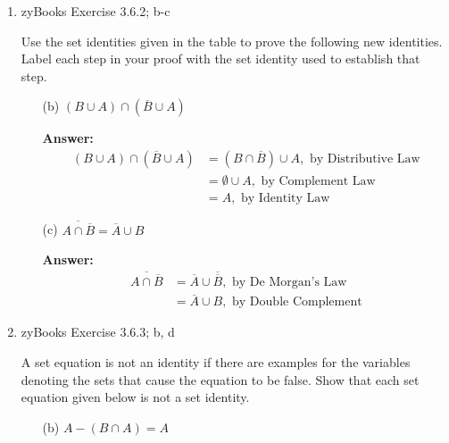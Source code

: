 \documentclass[14pt]{extreport}
\newcommand{\answer}[0]{\medskip \textbf{Answer:} \medskip}
\newcommand{\union}[0]{\cup}
\newcommand{\intersect}[0]{\cap}
\begin{document}
\begin{enumerate}
    
    \item zyBooks Exercise 3.6.2; b-c

    Use the set identities given in the table to prove the following new identities. Label each step in your proof with the set identity used to establish that step.

    
        \begin{enumerate}
            
            \item[(b)] \( (B \union A) \intersect (\overline{B} \union A) \)
            
                \answer
                \begin{align*}
                    (B \union A) \intersect (\overline{B} \union A) &= (B \intersect \overline{B}) \union A, \text{ by Distributive Law} \\
                        &= \emptyset \union A, \text{ by Complement Law} \\
                        &= A, \text{ by Identity Law}
                \end{align*}

            \item[(c)] \( \overline{A \intersect \overline{B}} = \overline{A} \union B \)
                
                \answer
                \begin{align*}
                    \overline{A \intersect \overline{B}} &= \overline{A} \union \overline{\overline{B}}, \text{ by De Morgan's Law} \\
                        &= \overline{A} \union B, \text{ by Double Complement}
                \end{align*}
            
        \end{enumerate}

    \item zyBooks Exercise 3.6.3; b, d
    
    A set equation is not an identity if there are examples for the variables denoting the sets that cause the equation to be false. Show that each set equation given below is not a set identity.
    
        \begin{enumerate}
            
            \item[(b)] \( A - (B \intersect A) = A \)
            

\end{enumerate}
\end{enumerate}
\end{document}
